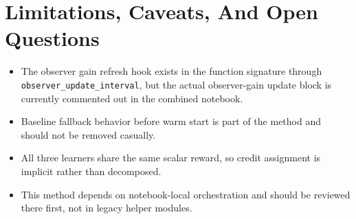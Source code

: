 \documentclass[11pt]{article}
\begin{document}
\section*{Limitations, Caveats, And Open Questions}

\begin{itemize}
\item The observer gain refresh hook exists in the function signature through
      \texttt{observer\_update\_interval}, but the actual observer-gain update
      block is currently commented out in the combined notebook.
\item Baseline fallback behavior before warm start is part of the method and
      should not be removed casually.
\item All three learners share the same scalar reward, so credit assignment is
      implicit rather than decomposed.
\item This method depends on notebook-local orchestration and should be reviewed
      there first, not in legacy helper modules.
\end{itemize}
\end{document}
